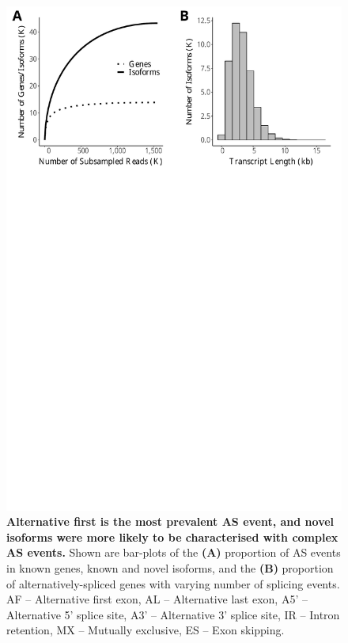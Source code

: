 \vspace{1cm}
\begin{figure}[!h]
	\begin{center}
		\includegraphics[page=5,trim={0 26cm 0 0},clip,scale = 0.55]{Figures/IsoSeqWholeTranscriptome.pdf}
	\end{center}
	\captionsetup{width=0.95\textwidth}
	\caption[Alternative splicing events from transcriptome profiling of the mouse cortex]%
	{\textbf{Alternative first is the most prevalent AS event, and novel isoforms were more likely to be characterised with complex AS events.} Shown are bar-plots of the \textbf{(A)} proportion of AS events in known genes, known and novel isoforms, and the \textbf{(B)} proportion of alternatively-spliced genes with varying number of splicing events. AF – Alternative first exon, AL – Alternative last exon, A5’ – Alternative 5’ splice site, A3’ – Alternative 3’ splice site, IR – Intron retention, MX – Mutually exclusive, ES – Exon skipping.}
	\label{fig:isoseq_whole_As_events}
\end{figure}


